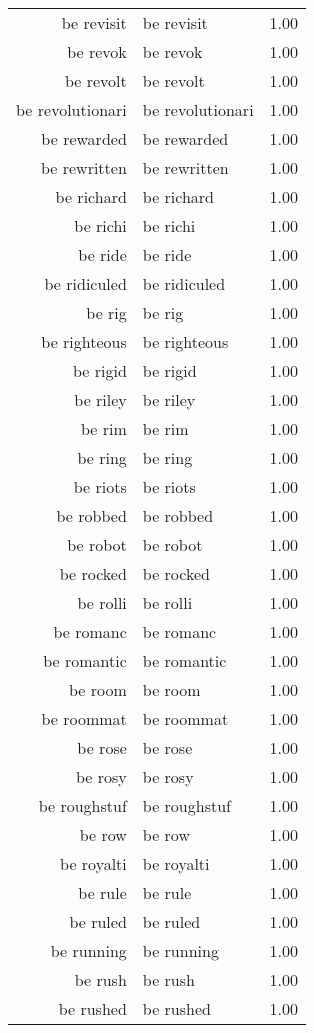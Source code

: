 \begin{table}[ht]
\begin{tabular}{rlr}
  be revisit & be revisit & 1.00 \\ 
  be revok & be revok & 1.00 \\ 
  be revolt & be revolt & 1.00 \\ 
  be revolutionari & be revolutionari & 1.00 \\ 
  be rewarded & be rewarded & 1.00 \\ 
  be rewritten & be rewritten & 1.00 \\ 
  be richard & be richard & 1.00 \\ 
  be richi & be richi & 1.00 \\ 
  be ride & be ride & 1.00 \\ 
  be ridiculed & be ridiculed & 1.00 \\ 
  be rig & be rig & 1.00 \\ 
  be righteous & be righteous & 1.00 \\ 
  be rigid & be rigid & 1.00 \\ 
  be riley & be riley & 1.00 \\ 
  be rim & be rim & 1.00 \\ 
  be ring & be ring & 1.00 \\ 
  be riots & be riots & 1.00 \\ 
  be robbed & be robbed & 1.00 \\ 
  be robot & be robot & 1.00 \\ 
  be rocked & be rocked & 1.00 \\ 
  be rolli & be rolli & 1.00 \\ 
  be romanc & be romanc & 1.00 \\ 
  be romantic & be romantic & 1.00 \\ 
  be room & be room & 1.00 \\ 
  be roommat & be roommat & 1.00 \\ 
  be rose & be rose & 1.00 \\ 
  be rosy & be rosy & 1.00 \\ 
  be roughstuf & be roughstuf & 1.00 \\ 
  be row & be row & 1.00 \\ 
  be royalti & be royalti & 1.00 \\ 
  be rule & be rule & 1.00 \\ 
  be ruled & be ruled & 1.00 \\ 
  be running & be running & 1.00 \\ 
  be rush & be rush & 1.00 \\ 
  be rushed & be rushed & 1.00 \\ 

\end{tabular}
\end{table}
